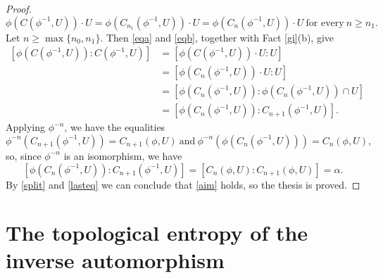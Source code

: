 \documentclass[11pt]{article}
\theoremstyle{definition}
\numberwithin{equation}{section}
\begin{document}
\begin{proof}
\begin{equation}
\phi(C(\phi^{-1},U))\cdot U=\phi(C_{n_1}(\phi^{-1},U)) \cdot U=\phi(C_{n}(\phi^{-1},U)) \cdot U\ \text{for every}\ n\geq n_1.
\end{equation}
Let $n\geq\max\{n_0,n_1\}$. Then \eqref{eqa} and \eqref{eqb}, together with Fact \ref{gi}(b), give 
\begin{equation}\label{split}\begin{split}
[\phi(C(\phi^{-1},U)):C(\phi^{-1},U)]&=[\phi(C(\phi^{-1},U))\cdot U:U]\\&=[\phi(C_n(\phi^{-1},U))\cdot U:U]\\&=[\phi(C_n(\phi^{-1},U)):\phi(C_n(\phi^{-1},U))\cap U]\\&=[\phi(C_n(\phi^{-1},U)):C_{n+1}(\phi^{-1},U)].
\end{split}\end{equation}
Applying $\phi^{-n}$, we have the equalities 
$$\phi^{-n}(C_{n+1}(\phi^{-1},U))=C_{n+1}(\phi,U)\ \text{and}\ \phi^{-n}(\phi(C_n(\phi^{-1},U)))=C_n(\phi,U),$$ so, since $\phi^{-n}$ is an isomorphism, we have
\begin{equation}\label{lasteq}
[\phi(C_n(\phi^{-1},U)):C_{n+1}(\phi^{-1},U)]=[C_n(\phi,U):C_{n+1}(\phi,U)]=\alpha.
\end{equation}
By \eqref{split} and \eqref{lasteq} we can conclude that \eqref{aim} holds, so the thesis is proved.
\end{proof}


\section{The topological entropy of the inverse automorphism}
\end{document}
